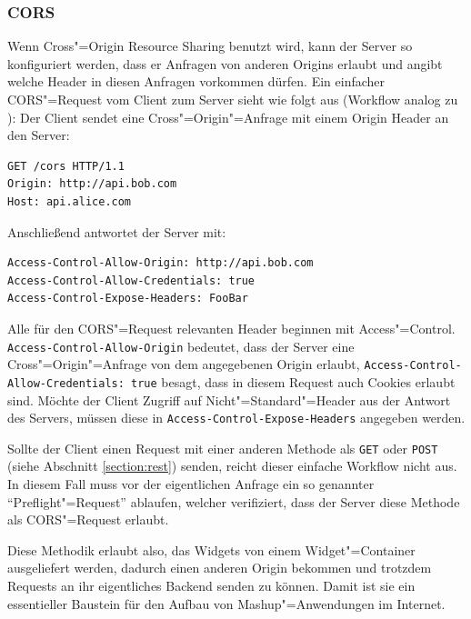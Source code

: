\subsubsection*{CORS}
Wenn Cross"=Origin Resource Sharing benutzt wird, kann der Server so konfiguriert werden, dass er Anfragen von anderen Origins erlaubt und angibt welche Header in diesen Anfragen vorkommen dürfen. Ein einfacher CORS"=Request vom Client zum Server sieht wie folgt aus (Workflow analog zu \cite{Hossain2012}):
Der Client sendet eine Cross"=Origin"=Anfrage mit einem Origin Header an den Server:
\begin{lstlisting}
GET /cors HTTP/1.1
Origin: http://api.bob.com
Host: api.alice.com
\end{lstlisting}
Anschließend antwortet der Server mit:
\begin{lstlisting}
Access-Control-Allow-Origin: http://api.bob.com
Access-Control-Allow-Credentials: true
Access-Control-Expose-Headers: FooBar
\end{lstlisting}
Alle für den CORS"=Request relevanten Header beginnen mit Access"=Control.\\ \texttt{Access\allowbreak -Control\allowbreak -Allow\allowbreak -Origin} bedeutet, dass der Server eine Cross"=Origin"=Anfrage von dem angegebenen Origin erlaubt, \texttt{Access\allowbreak -Control\allowbreak -Allow\allowbreak -Credentials: true} besagt, dass in diesem Request auch Cookies erlaubt sind. Möchte der Client Zugriff auf Nicht"=Standard"=Header aus der Antwort des Servers, müssen diese in \texttt{Access\allowbreak -Control\allowbreak -Expose\allowbreak -Headers} angegeben werden.

Sollte der Client einen Request mit einer anderen Methode als \texttt{GET} oder \texttt{POST} (siehe Abschnitt \ref{section:rest}) senden, reicht dieser einfache Workflow nicht aus. In diesem Fall muss vor der eigentlichen Anfrage ein so genannter "`Preflight"=Request"' ablaufen, welcher verifiziert, dass der Server diese Methode als CORS"=Request erlaubt.

Diese Methodik erlaubt also, das Widgets von einem Widget"=Container ausgeliefert werden, dadurch einen anderen Origin bekommen und trotzdem Requests an ihr eigentliches Backend senden zu können. Damit ist sie ein essentieller Baustein für den Aufbau von Mashup"=Anwendungen im Internet.

